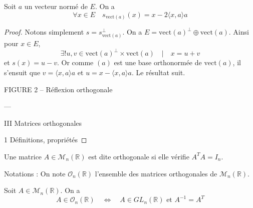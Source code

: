 \begin{proposition}[À refaire]
\label{prop:a-refaire}

Soit $a$ un vecteur normé de $E$. On a
\[
\forall x \in E \quad s_{\text{vect}(a)}(x) = x - 2 \langle x, a \rangle a
\]
\end{proposition}

\begin{proof}

Notons simplement $s = s_{\text{vect}(a)}^\perp$. On a $E = \text{vect}(a)^\perp \oplus \text{vect}(a)$. Ainsi pour $x \in E$,
\[
\exists ! u, v \in \text{vect}(a)^\perp \times \text{vect}(a) \quad | \quad x = u + v
\]
et $s(x) = u - v$. Or comme $(a)$ est une base orthonormée de $\text{vect}(a)$, il s'ensuit que $v = \langle x, a \rangle a$ et $u = x - \langle x, a \rangle a$. Le résultat suit.

\begin{center}
\end{center}

FIGURE 2 – Réflexion orthogonale

---

III Matrices orthogonales

1 Définitions, propriétés

\end{proof}

\begin{definition}
\label{def:7}

Une matrice $A \in \mathcal{M}_n(\mathbb{R})$ est dite orthogonale si elle vérifie $A^T A = I_n$.

Notations : On note $\mathcal{O}_n(\mathbb{R})$ l'ensemble des matrices orthogonales de $\mathcal{M}_n(\mathbb{R})$.

\end{definition}

\begin{proposition}
\label{prop:14}

Soit $A \in \mathcal{M}_n(\mathbb{R})$. On a
\[
A \in \mathcal{O}_n(\mathbb{R}) \quad \Leftrightarrow \quad A \in GL_n(\mathbb{R}) \text{ et } A^{-1} = A^T
\]
\end{proposition}

